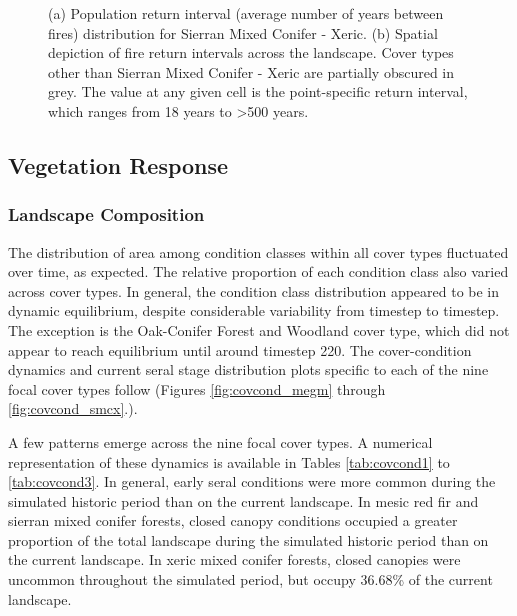 \begin{figure}[!htbp]
  \centering
  \caption{(a) Population return interval (average number of years between fires) distribution for Sierran Mixed Conifer - Xeric.  (b) Spatial depiction of fire return intervals across the landscape. Cover types other than Sierran Mixed Conifer - Xeric are partially obscured in grey. The value at any given cell is the point-specific return interval, which ranges from 18 years to \textgreater 500 years.}
\label{fig:preturn_smcx}
\end{figure}

\clearpage

\pagebreak[4]
\subsection{Vegetation Response}
\label{subsec:HRVvegresponse}

\subsubsection{Landscape Composition}

The distribution of area among condition classes within all cover types fluctuated over time, as expected. The relative proportion of each condition class also varied across cover types. In general, the condition class distribution appeared to be in dynamic equilibrium, despite considerable variability from timestep to timestep. The exception is the Oak-Conifer Forest and Woodland cover type, which did not appear to reach equilibrium until around timestep 220. The cover-condition dynamics and current seral stage distribution plots specific to each of the nine focal cover types follow (Figures \ref{fig:covcond_megm} through \ref{fig:covcond_smcx}.).

A few patterns emerge across the nine focal cover types. A numerical representation of these dynamics is available in Tables \ref{tab:covcond1} to \ref{tab:covcond3}. In general, early seral conditions were more common during the simulated historic period than on the current landscape. In mesic red fir and sierran mixed conifer forests, closed canopy conditions occupied a greater proportion of the total landscape during the simulated historic period than on the current landscape. In xeric mixed conifer forests, closed canopies were uncommon throughout the simulated period, but occupy 36.68\% of the current landscape.

